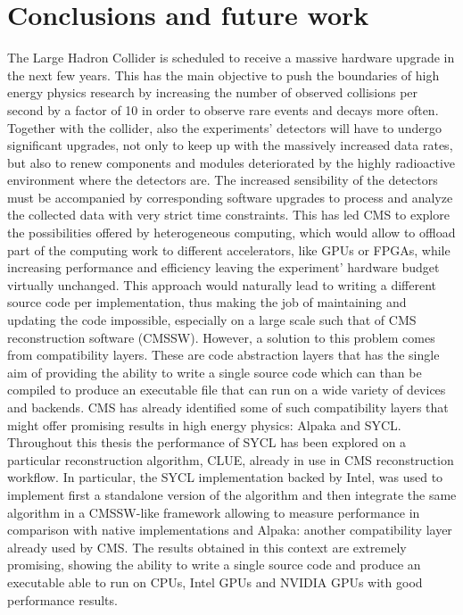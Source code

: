\chapter*{Conclusions and future work}
The Large Hadron Collider is scheduled to receive a massive hardware upgrade in the next few years. This has the main objective to push the boundaries of high energy physics research by increasing the number of observed collisions per second by a factor of 10 in order to observe rare events and decays more often. Together with the collider, also the experiments' detectors will have to undergo significant upgrades, not only to keep up with the massively increased data rates, but also to renew components and modules deteriorated by the highly radioactive environment where the detectors are. The increased sensibility of the detectors must be accompanied by corresponding software upgrades to process and analyze the collected data with very strict time constraints. This has led CMS to explore the possibilities offered by heterogeneous computing, which would allow to offload part of the computing work to different accelerators, like GPUs or FPGAs, while increasing performance and efficiency leaving the experiment' hardware budget virtually unchanged. This approach would naturally lead to writing a different source code per implementation, thus making the job of maintaining and updating the code impossible, especially on a large scale such that of CMS reconstruction software (CMSSW). However, a solution to this problem comes from compatibility layers. These are code abstraction layers that has the single aim of providing the ability to write a single source code which can than be compiled to produce an executable file that can run on a wide variety of devices and backends. CMS has already identified some of such compatibility layers that might offer promising results in high energy physics: Alpaka and SYCL. Throughout this thesis the performance of SYCL has been explored on a particular reconstruction algorithm, CLUE, already in use in CMS reconstruction workflow. In particular, the SYCL implementation backed by Intel, was used to implement first a standalone version of the algorithm and then integrate the same algorithm in a CMSSW-like framework allowing to measure performance in comparison with native implementations and Alpaka: another compatibility layer already used by CMS. The results obtained in this context are extremely promising, showing the ability to write a single source code and produce an executable able to run on CPUs, Intel GPUs and NVIDIA GPUs with good performance results. 

